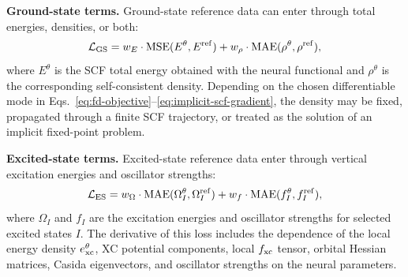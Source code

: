 \textbf{Ground-state terms.} Ground-state reference data can enter
through total energies, densities, or both:
\begin{equation}
  \mathcal{L}_{\rm GS} =
    w_E \cdot \text{MSE}(E^\theta, E^{\rm ref})
    + w_\rho \cdot \text{MAE}(\rho^\theta, \rho^{\rm ref}),
  \label{eq:gsloss}
\end{equation}
where $E^\theta$ is the SCF total energy obtained with the neural
functional and $\rho^\theta$ is the corresponding self-consistent
density. Depending on the chosen differentiable mode in
Eqs.~\eqref{eq:fd-objective}--\eqref{eq:implicit-scf-gradient}, the
density may be fixed, propagated through a finite SCF trajectory, or
treated as the solution of an implicit fixed-point problem.

\textbf{Excited-state terms.} Excited-state reference data enter
through vertical excitation energies and oscillator strengths:
\begin{equation}
  \mathcal{L}_{\rm ES} =
    w_\Omega \cdot \text{MAE}(\Omega_I^\theta, \Omega_I^{\rm ref})
    + w_f \cdot \text{MAE}(f_I^\theta, f_I^{\rm ref}),
  \label{eq:esloss}
\end{equation}
where $\Omega_I$ and $f_I$ are the excitation energies and
oscillator strengths for selected excited states $I$. The derivative
of this loss includes the dependence of the local energy density
$e_{\rm xc}^{\theta}$, XC potential components, local
$f_{\rm xc}$ tensor, orbital Hessian matrices, Casida eigenvectors,
and oscillator strengths on the neural parameters.
